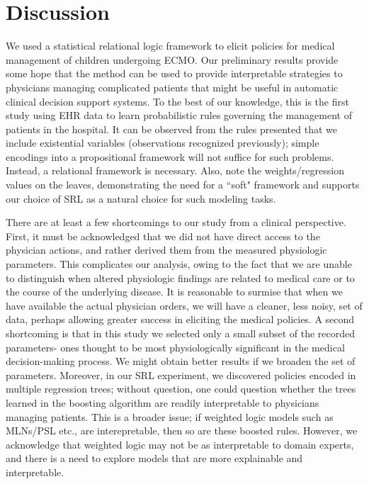 \documentclass[letterpaper]{article} %
\begin{document}
\section{Discussion}
We used a statistical relational logic framework to elicit policies for medical management of children undergoing ECMO. Our preliminary results provide some hope that the method can be used to provide interpretable strategies to physicians managing complicated patients that might be useful in automatic clinical decision support systems. To the best of our knowledge, this is the first study using EHR data to learn probabilistic rules governing the management of patients in the hospital. It can be observed from the rules presented that we include existential variables (observations recognized previously); simple encodings into a propositional framework will not suffice for such problems. Instead, a relational framework is necessary. Also, note the weights/regression values on the leaves, demonstrating the need for a ``soft" framework and supports our choice of SRL as a natural choice for such modeling tasks.

There are at least a few shortcomings to our study from a clinical perspective. First, it must be acknowledged that we did not have direct access to the physician actions, and rather derived them from the measured physiologic parameters. This complicates our analysis, owing to the fact that we are unable to distinguish when altered physiologic findings are related to medical care or to the course of the underlying disease. It is reasonable to surmise that when we have available the actual physician orders, we will have a cleaner, less noisy, set of data, perhaps allowing greater success in eliciting the medical policies. A second shortcoming is that in this study we selected only a small subset of the recorded parameters- ones thought to be most physiologically significant in the medical decision-making process. We might obtain better results if we broaden the set of parameters. Moreover, in our SRL experiment, we discovered policies encoded in multiple regression trees; without question, one could question whether the trees learned in the boosting algorithm are readily interpretable to physicians managing patients. This is a broader issue; if weighted logic models such as MLNs/PSL etc., are interepretable, then so are these boosted rules. However, we acknowledge that weighted logic may not be as interpretable to domain experts, and there is a need to explore models that are more explainable and interpretable. 
\end{document}
